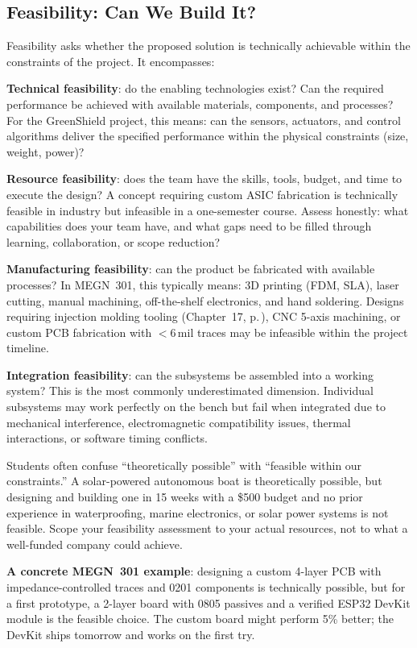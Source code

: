 \subsection{Feasibility: Can We Build It?}
Feasibility asks whether the proposed solution is technically achievable within the constraints of the project. It encompasses:

\textbf{Technical feasibility}: do the enabling technologies exist? Can the required performance be achieved with available materials, components, and processes? For the GreenShield project, this means: can the sensors, actuators, and control algorithms deliver the specified performance within the physical constraints (size, weight, power)?

\textbf{Resource feasibility}: does the team have the skills, tools, budget, and time to execute the design? A concept requiring custom ASIC fabrication is technically feasible in industry but infeasible in a one-semester course. Assess honestly: what capabilities does your team have, and what gaps need to be filled through learning, collaboration, or scope reduction?

\textbf{Manufacturing feasibility}: can the product be fabricated with available processes? In MEGN~301, this typically means: 3D printing (FDM, SLA), laser cutting, manual machining, off-the-shelf electronics, and hand soldering. Designs requiring injection molding tooling (Chapter~17, p.\,\pageref{ch:molding}), CNC 5-axis machining, or custom PCB fabrication with $<$6\,mil traces may be infeasible within the project timeline.

\textbf{Integration feasibility}: can the subsystems be assembled into a working system? This is the most commonly underestimated dimension. Individual subsystems may work perfectly on the bench but fail when integrated due to mechanical interference, electromagnetic compatibility issues, thermal interactions, or software timing conflicts.

\begin{warningbox}
Students often confuse ``theoretically possible'' with ``feasible within our constraints.'' A solar-powered autonomous boat is theoretically possible, but designing and building one in 15 weeks with a \$500 budget and no prior experience in waterproofing, marine electronics, or solar power systems is not feasible. Scope your feasibility assessment to your actual resources, not to what a well-funded company could achieve.

\textbf{A concrete MEGN~301 example}: designing a custom 4-layer PCB with impedance-controlled traces and 0201 components is technically possible, but for a first prototype, a 2-layer board with 0805 passives and a verified ESP32 DevKit module is the feasible choice. The custom board might perform 5\% better; the DevKit ships tomorrow and works on the first try.
\end{warningbox}

